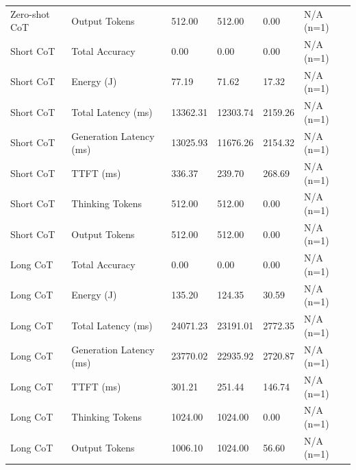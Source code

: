 \begin{table}
\begin{tabular}{llllll}
Zero-shot CoT & Output Tokens & 512.00 & 512.00 & 0.00 & N/A (n=1) \\
Short CoT & Total Accuracy & 0.00 & 0.00 & 0.00 & N/A (n=1) \\
Short CoT & Energy (J) & 77.19 & 71.62 & 17.32 & N/A (n=1) \\
Short CoT & Total Latency (ms) & 13362.31 & 12303.74 & 2159.26 & N/A (n=1) \\
Short CoT & Generation Latency (ms) & 13025.93 & 11676.26 & 2154.32 & N/A (n=1) \\
Short CoT & TTFT (ms) & 336.37 & 239.70 & 268.69 & N/A (n=1) \\
Short CoT & Thinking Tokens & 512.00 & 512.00 & 0.00 & N/A (n=1) \\
Short CoT & Output Tokens & 512.00 & 512.00 & 0.00 & N/A (n=1) \\
Long CoT & Total Accuracy & 0.00 & 0.00 & 0.00 & N/A (n=1) \\
Long CoT & Energy (J) & 135.20 & 124.35 & 30.59 & N/A (n=1) \\
Long CoT & Total Latency (ms) & 24071.23 & 23191.01 & 2772.35 & N/A (n=1) \\
Long CoT & Generation Latency (ms) & 23770.02 & 22935.92 & 2720.87 & N/A (n=1) \\
Long CoT & TTFT (ms) & 301.21 & 251.44 & 146.74 & N/A (n=1) \\
Long CoT & Thinking Tokens & 1024.00 & 1024.00 & 0.00 & N/A (n=1) \\
Long CoT & Output Tokens & 1006.10 & 1024.00 & 56.60 & N/A (n=1) \\
\bottomrule
\end{tabular}
\end{table}
